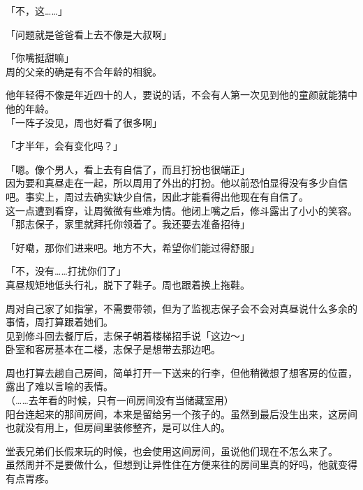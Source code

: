 「不，这……」

「问题就是爸爸看上去不像是大叔啊」

「你嘴挺甜嘛」\\

周的父亲的确是有不合年龄的相貌。

他年轻得不像是年近四十的人，要说的话，不会有人第一次见到他的童颜就能猜中他的年龄。\\

「一阵子没见，周也好看了很多啊」

「才半年，会有变化吗？」

「嗯。像个男人，看上去有自信了，而且打扮也很端正」\\

因为要和真昼走在一起，所以周用了外出的打扮。他以前恐怕显得没有多少自信吧。事实上，周过去确实缺少自信，因此才能看得出他现在有自信了。\\

这一点遭到看穿，让周微微有些难为情。他闭上嘴之后，修斗露出了小小的笑容。\\

「那志保子，家里就拜托你领着了。我还要去准备招待」

「好嘞，那你们进来吧。地方不大，希望你们能过得舒服」

「不，没有……打扰你们了」\\

真昼规矩地低头行礼，脱下了鞋子。周也跟着换上拖鞋。

周对自己家了如指掌，不需要带领，但为了监视志保子会不会对真昼说什么多余的事情，周打算跟着她们。\\

见到修斗回去餐厅后，志保子朝着楼梯招手说「这边～」\\

卧室和客房基本在二楼，志保子是想带去那边吧。

周也打算去趟自己房间，简单打开一下送来的行李，但他稍微想了想客房的位置，露出了难以言喻的表情。\\

（……去年看的时候，只有一间房间没有当储藏室用）\\

阳台连起来的那间房间，本来是留给另一个孩子的。虽然到最后没生出来，这房间也就没有用上，但房间里装修整齐，是可以住人的。

堂表兄弟们长假来玩的时候，也会使用这间房间，虽说他们现在不怎么来了。\\

虽然周并不是要做什么，但想到让异性住在方便来往的房间里真的好吗，他就变得有点胃疼。\\

